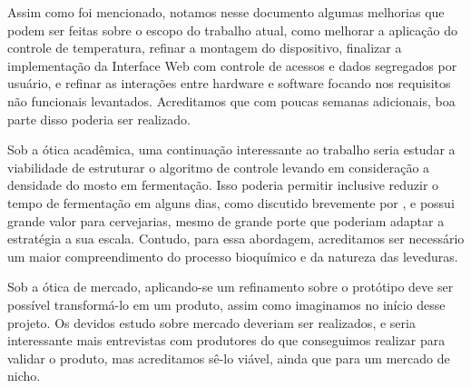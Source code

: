 Assim como foi mencionado, notamos nesse documento algumas melhorias que podem ser feitas sobre o escopo do trabalho atual,
como melhorar a aplicação do controle de temperatura, refinar a montagem do dispositivo, finalizar a implementação da Interface
Web com controle de acessos e dados segregados por usuário, e refinar as interações entre hardware e software focando nos requisitos
não funcionais levantados. Acreditamos que com poucas semanas adicionais, boa parte disso poderia ser realizado.

Sob a ótica acadêmica, uma continuação interessante ao trabalho seria estudar a viabilidade de estruturar o algoritmo de controle
levando em consideração a densidade do mosto em fermentação. Isso poderia permitir inclusive reduzir o tempo de fermentação em
alguns dias, como discutido brevemente por , e possui grande valor para cervejarias, mesmo de grande porte 
que poderiam adaptar a estratégia a sua escala. Contudo, para essa abordagem, acreditamos ser necessário um maior compreendimento do 
processo bioquímico e da natureza das leveduras.

Sob a ótica de mercado, aplicando-se um refinamento sobre o protótipo deve ser possível transformá-lo em um produto, assim como
imaginamos no início desse projeto. Os devidos estudo sobre mercado deveriam ser realizados, e seria interessante mais entrevistas 
com produtores do que conseguimos realizar para validar o produto, mas acreditamos sê-lo viável, ainda que para um mercado de nicho.


